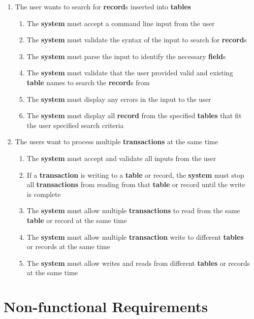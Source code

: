 \documentclass[12pt, titlepage]{article}
\begin{document}
\begin{enumerate}[{BE}1.]
\begin{enumerate}[{FR}1.]
    \end{enumerate}
    \item The user wants to search for \textbf{record}s inserted into \textbf{tables}
    \begin{enumerate}[{FR}1.]
        \item The \textbf{system} must accept a command line input from the user
        \item The \textbf{system} must validate the syntax of the input to search for \textbf{record}s
        \item The \textbf{system} must parse the input to identify the necessary \textbf{field}s
        \item The \textbf{system} must validate that the user provided valid and existing \textbf{table} names to search the \textbf{record}s from
        \item The \textbf{system} must display any errors in the input to the user
        \item The \textbf{system} must display all \textbf{record} from the specified \textbf{tables} that fit the user specified search criteria
    \end{enumerate}
    \item The users want to process multiple \textbf{transactions} at the same time
    \begin{enumerate}[{FR}1.]
        \item The \textbf{system} must accept and validate all inputs from the user
        \item If a \textbf{transaction} is writing to a \textbf{table} or record, the \textbf{system} must stop all \textbf{transactions} from reading from that \textbf{table} or record until the write is complete
        \item The \textbf{system} must allow multiple \textbf{transactions} to read from the same \textbf{table} or record at the same time
        \item The \textbf{system} must allow multiple \textbf{transaction} write to different \textbf{tables} or records at the same time
        \item The \textbf{system} must allow writes and reads from different \textbf{tables} or records at the same time
    \end{enumerate}
\end{enumerate}

\section{Non-functional Requirements}
\end{document}
